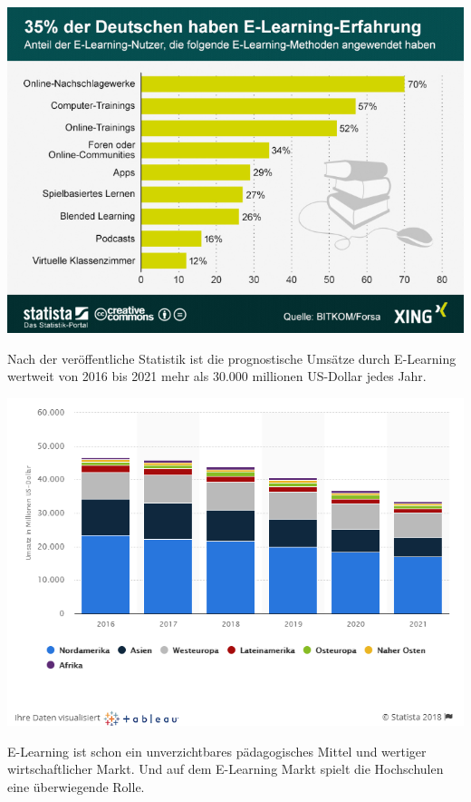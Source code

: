 \includegraphics[width=\textwidth]{images/eLearningErfahrung.png}

Nach der veröffentliche Statistik ist die prognostische Umsätze durch E-Learning wertweit von 2016 bis 2021 mehr als 30.000 millionen US-Dollar jedes Jahr.

\includegraphics[width=\textwidth]{images/umsatzDiagnose.png}

E-Learning ist schon ein unverzichtbares pädagogisches Mittel und wertiger wirtschaftlicher Markt. Und auf dem E-Learning Markt spielt die Hochschulen eine überwiegende Rolle.


